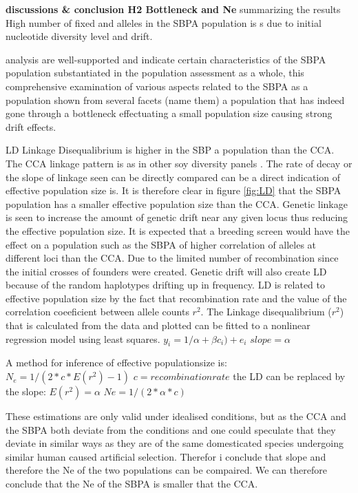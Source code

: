 \documentclass[9pt, twocolumn,twoside]{gsajnl}
\begin{document}
\textbf{discussions \& conclusion H2 Bottleneck and Ne}
summarizing the results
High number of fixed and alleles in the SBPA population is s due to initial nucleotide diversity level and drift. 


analysis are well-supported and indicate certain characteristics of the SBPA population substantiated in the population assessment as a whole, this comprehensive examination of various aspects related to the SBPA as a population shown from several facets (name them) a population that has indeed gone through a bottleneck effectuating a small population size causing strong drift effects. 

LD
Linkage Disequalibrium is higher in the SBP a population than the CCA. The CCA linkage pattern is as in other soy diversity panels \cite{liu16}. The rate of decay or the slope of linkage seen can be directly compared can be a direct indication of effective population size is. It is therefore clear in figure \ref{fig:LD} that the SBPA population has a smaller effective population size than the CCA.
Genetic linkage is seen to increase the amount of genetic drift near any given locus thus reducing the effective population size. It is expected that a breeding screen would have the effect on a population such as the SBPA of higher correlation of alleles  at different loci than the CCA. Due to the limited number of recombination since the initial crosses of founders were created. Genetic drift will also create LD because of the random haplotypes drifting up in frequency.  
LD is related to effective population size by the fact that recombination rate and the value of the correlation coeeficient between allele counts $r^2$. The Linkage disequalibrium ($r^2$) that is calculated from the data and plotted can be fitted to a nonlinear regression model using least squares. 
$y_i=1/\alpha+\beta  c_i)  +e_i$
$slope = \alpha$

A method for inference of effective populationsize is:
$N_e = 1 / (2 * c * E(r^2) - 1)$
$c= recombination rate $
the LD can be replaced by the slope: 
$E(r^2) =\alpha$
$Ne = 1 / (2 * \alpha * c)$

These estimations are only valid under idealised conditions, but as the CCA and the SBPA both deviate from the conditions and one could speculate that they deviate in similar ways as they are of the same domesticated species undergoing similar human caused artificial selection. Therefor i conclude that slope and therefore the Ne of the two populations can be compaired. We can therefore conclude that the Ne of the SBPA is smaller that the CCA.    
\end{document}
